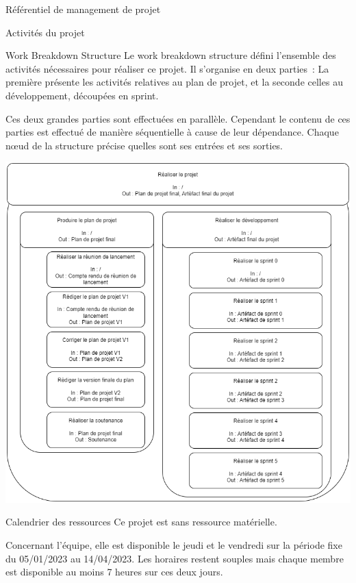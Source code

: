 \documentclass[]{article}
\begin{document}
{\begin{section}{\label{sec:Référentiel de management de projet}Référentiel de management de projet}
     \newpage

     \begin{subsection}{\label{sec:Activités du projet}Activités du projet}
         \begin{subsubsection}{\label{sec:Work Breakdown Structure}Work Breakdown Structure}
             Le work breakdown structure défini l’ensemble des activités nécessaires pour réaliser ce projet. Il s’organise en deux parties : La première présente les activités relatives au plan de projet, et la seconde celles au développement, découpées en sprint.

             Ces deux grandes parties sont effectuées en parallèle. Cependant le contenu de ces parties est effectué de manière séquentielle à cause de leur dépendance. Chaque nœud de la structure précise quelles sont ses entrées et ses sorties.

             \includegraphics[scale=0.45]{documents/IMG/WBS}
         \end{subsubsection}

         \newpage

         \begin{subsubsection}{\label{sec:Calendrier des ressources}Calendrier des ressources}
             Ce projet est sans ressource matérielle.

             Concernant l’équipe, elle est disponible le jeudi et le vendredi sur la période fixe du 05/01/2023 au 14/04/2023. Les horaires restent souples mais chaque membre est disponible au moins 7 heures sur ces deux jours.


\end{subsubsection}
\end{subsection}
\end{section}}
\end{document}
